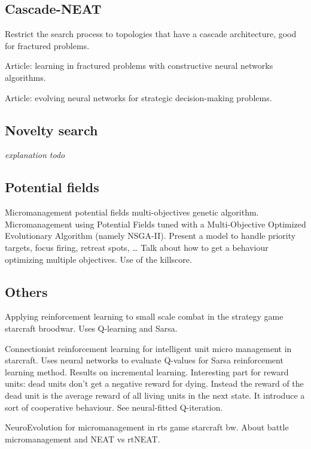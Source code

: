 \subsection{Cascade-NEAT}\label{subsec:cascade-neat}

Restrict the search process to topologies that have a cascade
architecture, good for fractured problems.

Article: learning in fractured problems with constructive neural networks algorithms.

Article: evolving neural networks for strategic decision-making problems.

\subsection{Novelty search}\label{subsec:novelty-search}

\emph{explanation todo} \cite{LeSt11}

\subsection{Potential fields}\label{subsec:potential-fields}

Micromanagement potential fields multi-objectives genetic
algorithm. Micromanagement using Potential Fields tuned with a
Multi-Objective Optimized Evolutionary Algorithm (namely
NSGA-II). Present a model to handle priority targets, focus firing,
retreat spots, … Talk about how to get a behaviour optimizing multiple
objectives. Use of the killscore.

\citet{SiSuBa14}

\subsection{Others}\label{subsec:others}

Applying reinforcement learning to small scale combat in the strategy
game starcraft broodwar. Uses Q-learning and Sarsa.

Connectionist reinforcement learning for intelligent unit micro
management in starcraft.  Uses neural networks to evaluate Q-values
for Sarsa reinforcement learning method. Results on incremental
learning.  Interesting part for reward units: dead units don’t get a
negative reward for dying.  Instead the reward of the dead unit is the
average reward of all living units in the next state.  It introduce a
sort of cooperative behaviour. See neural-fitted Q-iteration.

NeuroEvolution for micromanagement in rts game starcraft bw. About
battle micromanagement and NEAT vs rtNEAT.

